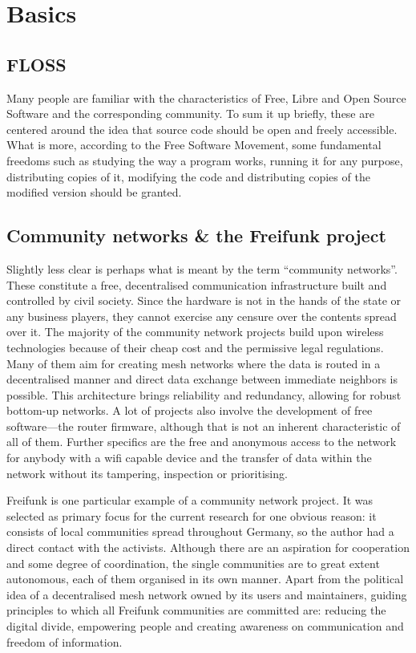 \section{Basics}
\subsection{FLOSS}
Many people are familiar with the characteristics of Free, Libre and Open Source Software and the corresponding community.
To sum it up briefly, these are centered around the idea that source code should be open and freely accessible.
What is more, according to the Free Software Movement,
some fundamental freedoms such as studying the way a program works, running it for any purpose, distributing copies of it, modifying the code and distributing copies of the modified version should be granted\cite{gnuweb}.


\subsection{Community networks \& the Freifunk project}
Slightly less clear is perhaps what is meant by the term ``community networks''.
These constitute a free, decentralised communication infrastructure built and controlled by civil society.
Since the hardware is not in the hands of the state or any business players, they cannot exercise any censure over the contents spread over it. %
The majority of the community network projects build upon wireless technologies because of their cheap cost and the permissive legal regulations\cite{WNDW2013}\cite{Medosch2004}.
Many of them aim for creating mesh networks where the data is routed in a decentralised manner and direct data exchange between immediate neighbors is possible.
This architecture brings reliability and redundancy, allowing for robust bottom-up networks\cite{Medosch2004}.
A lot of projects also involve the development of free software---the router firmware, although that is not an inherent characteristic of all of them.
Further specifics are the free and anonymous access to the network for anybody with a wifi capable device and the transfer of data within the network without its tampering, inspection or prioritising\cite{ffweb}\cite{Medosch2004}. %

Freifunk is one particular example of a community network project.
It was selected as primary focus for the current research for one obvious reason: it consists of local communities spread throughout Germany, so the author had a direct contact with the activists.
Although there are an aspiration for cooperation and some degree of coordination, the single communities are to great extent autonomous, each of them organised in its own manner.
Apart from the political idea of a decentralised mesh network owned by its users and maintainers, guiding principles to which all Freifunk communities are committed are: reducing the digital divide, empowering people and creating awareness on communication and freedom of information\cite{ffweb}.

